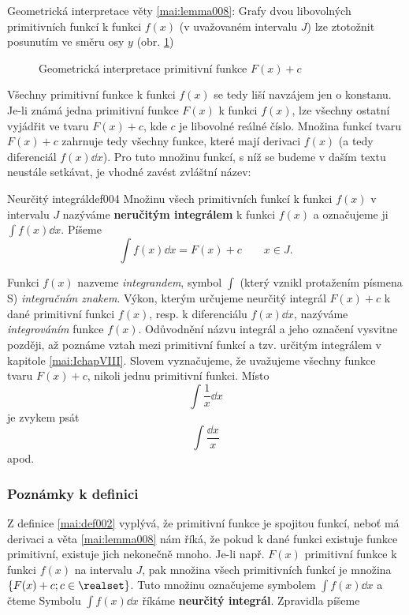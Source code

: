       Geometrická interpretace věty \ref{mai:lemma008}: Grafy dvou libovolných primitivních funkcí k
      funkci \(f(x)\) (v uvažovaném intervalu \(J\)) lze ztotožnit posunutím ve směru osy \(y\)
      (obr. \ref{mai:fig078})

      \begin{figure}[ht!]
        \centering
        \caption{Geometrická interpretace primitivní funkce \(F(x) +c\)}
        \label{mai:fig078}
      \end{figure}

      Všechny primitivní funkce k funkci \(f(x)\) se tedy liší navzájem jen o konstanu. Je-li známá
      jedna primitivní funkce \(F(x)\) k funkci \(f(x)\), lze všechny ostatní vyjádřit ve tvaru
      \(F(x) + c\), kde \(c\) je libovolné reálné číslo. Množina funkcí tvaru \(F(x) + c\) zahrnuje
      tedy všechny funkce, které mají derivaci \(f(x)\) (a tedy diferenciál \(f(x)\dd{x}\)). Pro
      tuto množinu funkcí, s níž se budeme v daším textu neustále setkávat, je vhodné zavést
      zvláštní název:  

      \begin{mathdef}{Neurčitý integrál}{def004} 
        Množinu všech primitivních funkcí k funkci \(f(x)\) v intervalu \(J\) nazýváme
        \textbf{neručitým integrálem} k funkci \(f(x)\) a označujeme ji \(\int f(x)\dd{x}\). Píšeme 
        \[\int f(x)\dd{x} = F(x) + c \qquad x\in J.\]
      \end{mathdef}

      Funkci \(f(x)\) nazveme \emph{integrandem}, symbol \(\int\) (který vznikl protažením písmena
      S) \emph{integračním znakem}. Výkon, kterým určujeme neurčitý integrál \(F(x) + c\) k dané
      primitivní funkci \(f(x)\), resp. k diferenciálu \(f(x)\dd{x}\), nazýváme \emph{integrováním}
      funkce \(f(x)\). Odůvodnění názvu integrál a jeho označení vysvitne později, až poznáme vztah
      mezi primitivní funkcí a tzv. určitým integrálem v kapitole \ref{mai:IchapVIII}. Slovem
       vyznačujeme, že uvažujeme všechny funkce tvaru \(F(x)+ c\), nikoli jednu
      primitivní funkci. Místo \[\int\dfrac{1}{x}\dd{x}\] je zvykem psát \[\int\dfrac{\dd{x}}{x}\]
      apod. 

      \subsubsection{Poznámky k definici}  
        Z definice \ref{mai:def002} vyplývá, že primitivní funkce je spojitou funkcí, neboť má
        derivaci a věta \ref{mai:lemma008} nám říká, že pokud k dané funkci existuje funkce
        primitivní, existuje jich nekonečně mnoho. Je-li např. \(F(x)\) primitivní funkce k funkci
        \(f(x)\) na intervalu \(J\), pak množina všech primitivních funkcí je množina \(\{F(x) + c;
        c\in\realset\}\). Tuto množinu označujeme symbolem \(\int f(x)\dd{x}\) a čteme  Symbolu \(\int f(x)\dd{x}\) říkáme \textbf{neurčitý integrál}. Zpravidla
        píšeme

